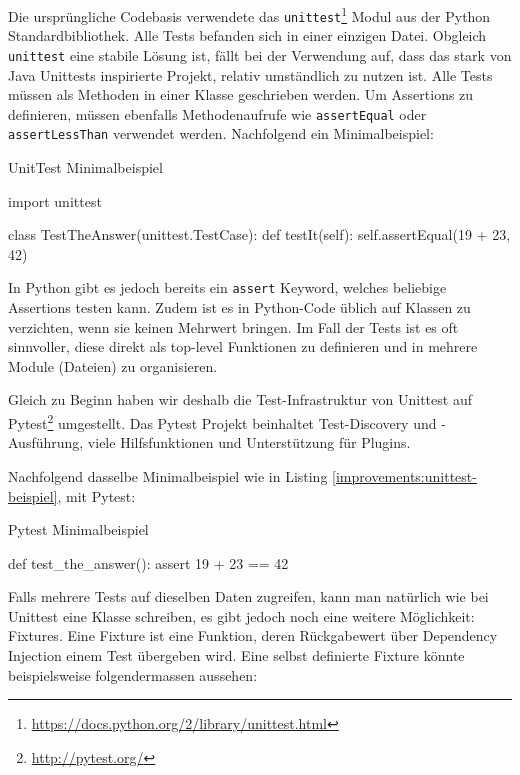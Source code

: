 Die ursprüngliche Codebasis verwendete das
\texttt{unittest}\footnote{\url{https://docs.python.org/2/library/unittest.html}}
Modul aus der Python Standardbibliothek. Alle Tests befanden sich in einer
einzigen Datei.  Obgleich \texttt{unittest} eine stabile Lösung ist, fällt
bei der Verwendung auf, dass das stark von Java Unittests
inspirierte Projekt, relativ umständlich zu nutzen ist. Alle Tests müssen als
Methoden in einer Klasse geschrieben werden. Um Assertions zu definieren,
müssen ebenfalls Methodenaufrufe wie \texttt{assertEqual} oder
\texttt{assertLessThan} verwendet werden. Nachfolgend ein Minimalbeispiel:

\begin{listing}
\caption{UnitTest Minimalbeispiel}
\label{improvements:unittest-beispiel}
\begin{pythoncode}
import unittest

class TestTheAnswer(unittest.TestCase):
    def testIt(self):
        self.assertEqual(19 + 23, 42)
\end{pythoncode}
\end{listing}

In Python gibt es jedoch bereits ein \texttt{assert} Keyword, welches beliebige
Assertions testen kann. Zudem ist es in Python-Code üblich auf Klassen zu
verzichten, wenn sie keinen Mehrwert bringen. Im Fall der Tests ist es oft
sinnvoller, diese direkt als top-level Funktionen zu definieren und in
mehrere Module (Dateien) zu organisieren.

Gleich zu Beginn haben wir deshalb die Test-Infrastruktur von Unittest auf
Pytest\footnote{\url{http://pytest.org/}} umgestellt. Das Pytest Projekt
beinhaltet Test-Discovery und -Ausführung, viele Hilfsfunktionen und
Unterstützung für Plugins.

Nachfolgend dasselbe Minimalbeispiel wie in Listing
\ref{improvements:unittest-beispiel}, mit Pytest:

\begin{listing}
\caption{Pytest Minimalbeispiel}
\label{improvements:pytest-beispiel}
\begin{pythoncode}
def test_the_answer():
    assert 19 + 23 == 42
\end{pythoncode}
\end{listing}

Falls mehrere Tests auf dieselben Daten zugreifen, kann man natürlich wie bei
Unittest eine Klasse schreiben, es gibt jedoch noch eine weitere Möglichkeit:
Fixtures. Eine Fixture ist eine Funktion, deren Rückgabewert über Dependency
Injection einem Test übergeben wird. Eine selbst definierte Fixture könnte
beispielsweise folgendermassen aussehen:

